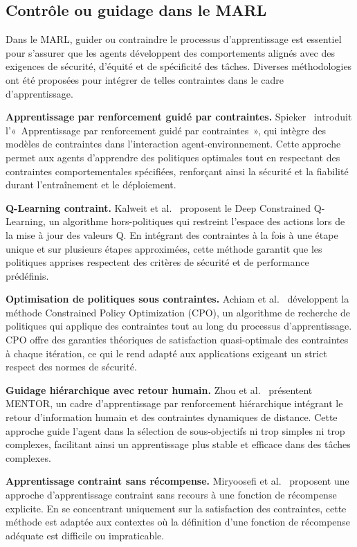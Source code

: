 \documentclass[pdflatex,sn-mathphys-num]{sn-jnl}%
\theoremstyle{thmstyleone}%
\theoremstyle{thmstyletwo}%
\theoremstyle{thmstylethree}%
\begin{document}
\subsection{Contrôle ou guidage dans le MARL}\label{sub-sec:rel_control}

Dans le MARL, guider ou contraindre le processus d’apprentissage est essentiel pour s’assurer que les agents développent des comportements alignés avec des exigences de sécurité, d’équité et de spécificité des tâches. Diverses méthodologies ont été proposées pour intégrer de telles contraintes dans le cadre d’apprentissage.

\textbf{Apprentissage par renforcement guidé par contraintes.} Spieker~\cite{spieker2021constraint} introduit l’« Apprentissage par renforcement guidé par contraintes », qui intègre des modèles de contraintes dans l’interaction agent-environnement. Cette approche permet aux agents d’apprendre des politiques optimales tout en respectant des contraintes comportementales spécifiées, renforçant ainsi la sécurité et la fiabilité durant l’entraînement et le déploiement.

\textbf{Q-Learning contraint.} Kalweit et al.~\cite{kalweit2020deep} proposent le Deep Constrained Q-Learning, un algorithme hors-politiques qui restreint l’espace des actions lors de la mise à jour des valeurs Q. En intégrant des contraintes à la fois à une étape unique et sur plusieurs étapes approximées, cette méthode garantit que les politiques apprises respectent des critères de sécurité et de performance prédéfinis.

\textbf{Optimisation de politiques sous contraintes.} Achiam et al.~\cite{achiam2017constrained} développent la méthode Constrained Policy Optimization (CPO), un algorithme de recherche de politiques qui applique des contraintes tout au long du processus d’apprentissage. CPO offre des garanties théoriques de satisfaction quasi-optimale des contraintes à chaque itération, ce qui le rend adapté aux applications exigeant un strict respect des normes de sécurité.

\textbf{Guidage hiérarchique avec retour humain.} Zhou et al.~\cite{zhou2024mentor} présentent MENTOR, un cadre d’apprentissage par renforcement hiérarchique intégrant le retour d’information humain et des contraintes dynamiques de distance. Cette approche guide l’agent dans la sélection de sous-objectifs ni trop simples ni trop complexes, facilitant ainsi un apprentissage plus stable et efficace dans des tâches complexes.

\textbf{Apprentissage contraint sans récompense.} Miryoosefi et al.~\cite{miryoosefi2022simple} proposent une approche d’apprentissage contraint sans recours à une fonction de récompense explicite. En se concentrant uniquement sur la satisfaction des contraintes, cette méthode est adaptée aux contextes où la définition d’une fonction de récompense adéquate est difficile ou impraticable.
\end{document}
